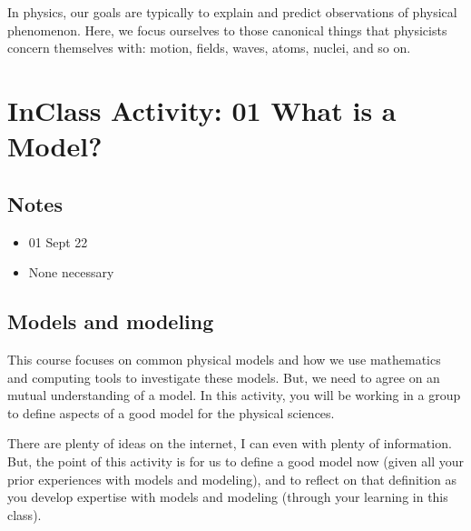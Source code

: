 \documentclass[letterpaper,10pt,english]{jupyterBook}
\begin{document}
\sphinxAtStartPar
In physics, our goals are typically to explain and predict observations of physical phenomenon. Here, we focus ourselves to those canonical things that physicists concern themselves with: motion, fields, waves, atoms, nuclei, and so on.

\sphinxstepscope


\section{In\sphinxhyphen{}Class Activity: 01 \sphinxhyphen{} What is a Model?}
\label{\detokenize{content/1_modeling/activity-what_is_a_model:in-class-activity-01-what-is-a-model}}\label{\detokenize{content/1_modeling/activity-what_is_a_model::doc}}

\subsection{Notes}
\label{\detokenize{content/1_modeling/activity-what_is_a_model:notes}}\begin{itemize}
\item {} 
\sphinxAtStartPar
{} 01 Sept 22

\item {} 
\sphinxAtStartPar
{} None necessary

\end{itemize}


\subsection{Models and modeling}
\label{\detokenize{content/1_modeling/activity-what_is_a_model:models-and-modeling}}
\sphinxAtStartPar
This course focuses on common physical models and how we use mathematics and computing tools to investigate these models. But, we need to agree on an mutual understanding of a model. In this activity, you will be working in a group to define aspects of a good model for the physical sciences.

\sphinxAtStartPar
There are plenty of ideas on the internet, I can even  with plenty of information. But, the point of this activity is for us to define a good model now (given all your prior experiences with models and modeling), and to reflect on that definition as you develop expertise with models and modeling (through your learning in this class).
\end{document}
